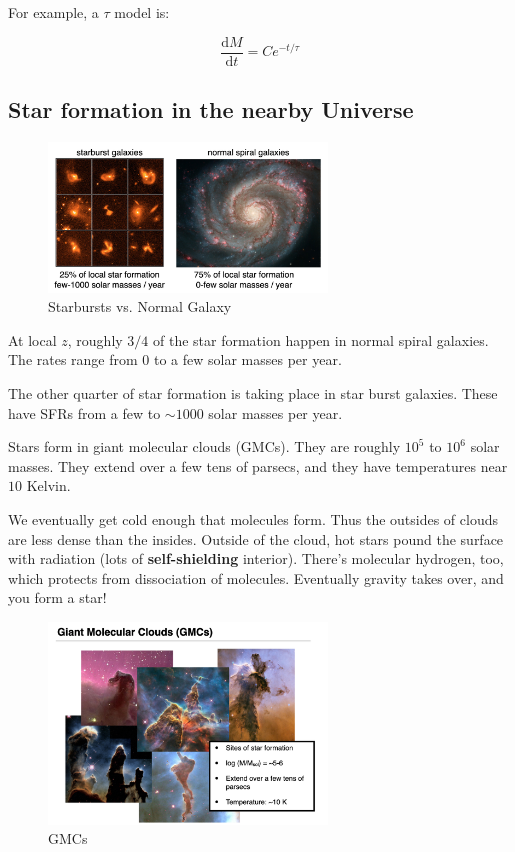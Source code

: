 \documentclass{article}
\begin{document}
For example, a $\tau$ model is:

\begin{equation}
    \frac{\mathrm{d}M}{\mathrm{d}t} = Ce^{-t/\tau}
\end{equation}

\subsection{Star formation in the nearby Universe}

\begin{figure}
    \centering
    \includegraphics[width=0.66\textwidth]{figs/Screen Shot 2021-09-24 at 3.31.02 PM.png}
    \caption{Starbursts vs. Normal Galaxy}
    \label{fig:starbs}
\end{figure}

At local $z$, roughly $3/4$ of the star formation happen in normal spiral galaxies. The rates range from 0 to a few solar masses per year.

The other quarter of star formation is taking place in star burst galaxies. These have SFRs from a few to $\sim1000$ solar masses per year. 

Stars form in giant molecular clouds (GMCs). They are roughly $10^5$ to $10^6$ solar masses. They extend over a few tens of parsecs, and they have temperatures near $10$ Kelvin. 

We eventually get cold enough that molecules form. Thus the outsides of clouds are less dense than the insides. Outside of the cloud, hot stars pound the surface with radiation (lots of \textbf{self-shielding} interior). There's molecular hydrogen, too, which protects from dissociation of molecules. Eventually gravity takes over, and you form a star!

\begin{figure}
    \centering
    \includegraphics[width=0.66\textwidth]{figs/Screen Shot 2021-09-24 at 3.32.28 PM.png}
    \caption{GMCs}
    \label{fig:GMCs}
\end{figure}
\end{document}
